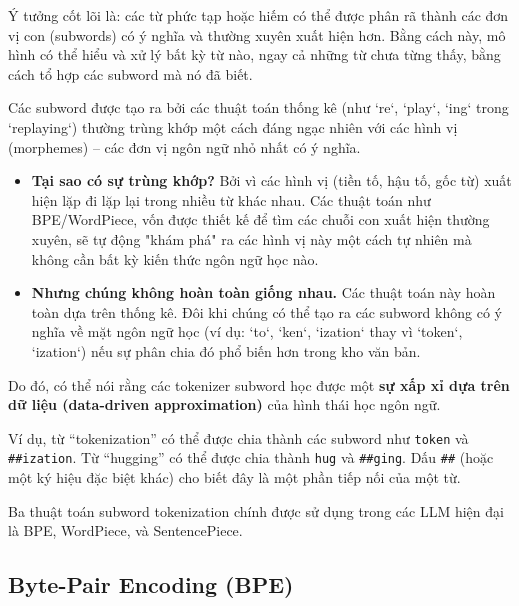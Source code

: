\begin{tcolorbox}[
    title=Triết lý của Subword Tokenization,
    colback=yellow!10!white, colframe=yellow!50!black, fonttitle=\bfseries
]
Ý tưởng cốt lõi là: các từ phức tạp hoặc hiếm có thể được phân rã thành các đơn vị con (subwords) có ý nghĩa và thường xuyên xuất hiện hơn. Bằng cách này, mô hình có thể hiểu và xử lý bất kỳ từ nào, ngay cả những từ chưa từng thấy, bằng cách tổ hợp các subword mà nó đã biết.
\end{tcolorbox}
\begin{tcolorbox}[
    title={Subword có phải là Hình vị (Morpheme) không?},
    colback=blue!5!white, colframe=blue!75!black, fonttitle=\bfseries
]
Các subword được tạo ra bởi các thuật toán thống kê (như `re`, `play`, `ing` trong `replaying`) thường trùng khớp một cách đáng ngạc nhiên với các hình vị (morphemes) -- các đơn vị ngôn ngữ nhỏ nhất có ý nghĩa.
\begin{itemize}
    \item \textbf{Tại sao có sự trùng khớp?} Bởi vì các hình vị (tiền tố, hậu tố, gốc từ) xuất hiện lặp đi lặp lại trong nhiều từ khác nhau. Các thuật toán như BPE/WordPiece, vốn được thiết kế để tìm các chuỗi con xuất hiện thường xuyên, sẽ tự động "khám phá" ra các hình vị này một cách tự nhiên mà không cần bất kỳ kiến thức ngôn ngữ học nào.
    \item \textbf{Nhưng chúng không hoàn toàn giống nhau.} Các thuật toán này hoàn toàn dựa trên thống kê. Đôi khi chúng có thể tạo ra các subword không có ý nghĩa về mặt ngôn ngữ học (ví dụ: `to`, `ken`, `ization` thay vì `token`, `ization`) nếu sự phân chia đó phổ biến hơn trong kho văn bản.
\end{itemize}
Do đó, có thể nói rằng các tokenizer subword học được một \textbf{sự xấp xỉ dựa trên dữ liệu (data-driven approximation)} của hình thái học ngôn ngữ.
\end{tcolorbox}
Ví dụ, từ ``tokenization'' có thể được chia thành các subword như \texttt{token} và \texttt{\#\#ization}. 
Từ ``hugging'' có thể được chia thành \texttt{hug} và \texttt{\#\#ging}. 
Dấu \texttt{\#\#} (hoặc một ký hiệu đặc biệt khác) cho biết đây là một phần tiếp nối của một từ.

Ba thuật toán subword tokenization chính được sử dụng trong các LLM hiện đại là BPE, WordPiece, và SentencePiece.

\subsection{Byte-Pair Encoding (BPE)}
\label{ssec:bpe}

